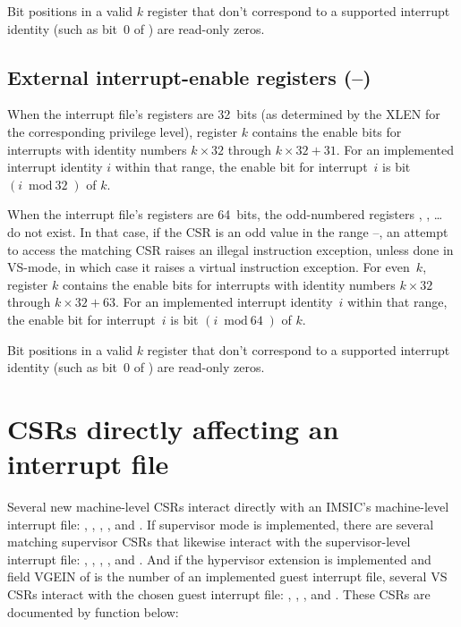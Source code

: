Bit positions in a valid $k$ register that don't correspond
to a supported interrupt identity (such as bit~0 of ) are
read-only zeros.

\subsection{External interrupt-enable registers (--)}

When the interrupt file's registers are 32~bits (as determined by
the XLEN for the corresponding privilege level), register $k$
contains the enable bits for interrupts with identity numbers
$k\times\mbox{32}$ through ${k\times\mbox{32} + \mbox{31}}$.
For an implemented interrupt identity $i$ within that range, the enable
bit for interrupt~$i$ is bit $(i\bmod\mbox{32})$ of $k$.

When the interrupt file's registers are 64~bits, the odd-numbered
registers , , \dots {} do not exist.
In that case, if the  CSR is an odd value in the range
--, an attempt to access the matching  CSR
raises an illegal instruction exception, unless done in VS-mode, in
which case it raises a virtual instruction exception.
For even~$k$, register $k$ contains the enable bits for
interrupts with identity numbers $k\times\mbox{32}$ through
${k\times\mbox{32} + \mbox{63}}$.
For an implemented interrupt identity~$i$ within that range, the enable
bit for interrupt~$i$ is bit $(i\bmod\mbox{64})$ of $k$.

Bit positions in a valid $k$ register that don't correspond
to a supported interrupt identity (such as bit~0 of ) are
read-only zeros.

\section{CSRs directly affecting an interrupt file}

Several new machine-level CSRs interact directly with an IMSIC's
machine-level interrupt file:  , ,
, , and .
If supervisor mode is implemented, there are several matching
supervisor CSRs that likewise interact with the supervisor-level
interrupt file:  , , ,
, and .
And if the hypervisor extension is implemented and field VGEIN of
 is the number of an implemented guest interrupt file,
several VS CSRs interact with the chosen guest interrupt file:
, , , and .
These CSRs are documented by function below:

